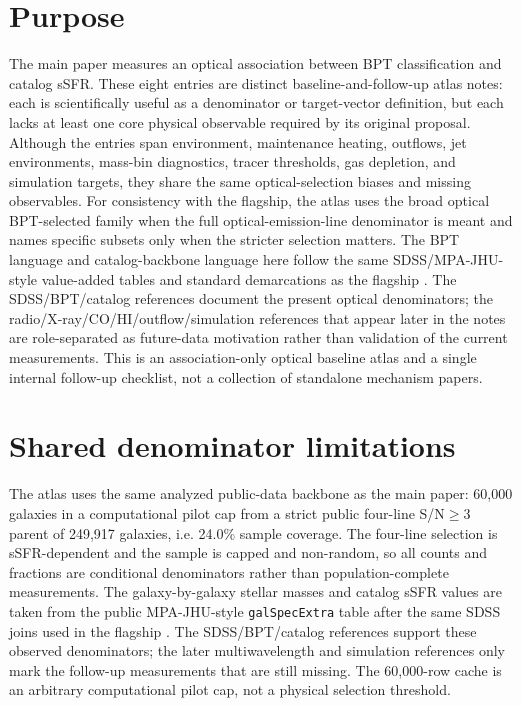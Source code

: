 \documentclass[twocolumn]{aastex631}
\begin{document}
\section{Purpose}
The main paper measures an optical association between BPT classification and catalog sSFR. These eight entries are distinct baseline-and-follow-up atlas notes: each is scientifically useful as a denominator or target-vector definition, but each lacks at least one core physical observable required by its original proposal. Although the entries span environment, maintenance heating, outflows, jet environments, mass-bin diagnostics, tracer thresholds, gas depletion, and simulation targets, they share the same optical-selection biases and missing observables. For consistency with the flagship, the atlas uses the broad optical BPT-selected family when the full optical-emission-line denominator is meant and names specific subsets only when the stricter selection matters. The BPT language and catalog-backbone language here follow the same SDSS/MPA-JHU-style value-added tables and standard demarcations as the flagship \citep{sdssdr17,brinchmann2004,york2000,baldwin1981,kewley2001,kauffmann2003bpt,kewley2006,stasinska2008,stasinska2015}. The SDSS/BPT/catalog references document the present optical denominators; the radio/X-ray/CO/HI/outflow/simulation references that appear later in the notes are role-separated as future-data motivation rather than validation of the current measurements. This is an association-only optical baseline atlas and a single internal follow-up checklist, not a collection of standalone mechanism papers.

\section{Shared denominator limitations}
The atlas uses the same analyzed public-data backbone as the main paper: 60,000 galaxies in a computational pilot cap from a strict public four-line S/N$\geq3$ parent of 249,917 galaxies, i.e. 24.0\% sample coverage. The four-line selection is sSFR-dependent and the sample is capped and non-random, so all counts and fractions are conditional denominators rather than population-complete measurements. The galaxy-by-galaxy stellar masses and catalog sSFR values are taken from the public MPA-JHU-style \texttt{galSpecExtra} table after the same SDSS joins used in the flagship \citep{sdssdr17,brinchmann2004,york2000}. The SDSS/BPT/catalog references support these observed denominators; the later multiwavelength and simulation references only mark the follow-up measurements that are still missing. The 60,000-row cache is an arbitrary computational pilot cap, not a physical selection threshold.
\end{document}
